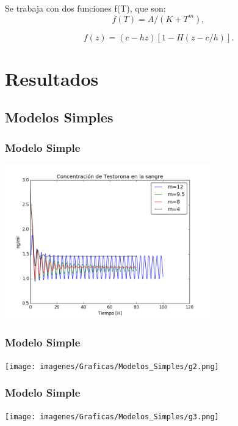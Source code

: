 \documentclass[10pt]{beamer}
\begin{document}
\begin{frame}
Se trabaja con dos funciones f(T), que son: \\

$$f(T) = A/(K+T^m) ,$$

$$ f(z) = (c-hz)[1-H(z-c/h)] .$$

\end{frame}

\section{Resultados}
\subsection{Modelos Simples}
\begin{frame}
\frametitle{Modelo Simple}
\begin{center}
 \includegraphics[width=3.5in]{imagenes/Graficas/Modelos_Simples/g1.png}
\end{center}
\end{frame}

\begin{frame}
\frametitle{Modelo Simple}
\begin{center}
 \texttt{[image: imagenes/Graficas/Modelos\_Simples/g2.png]}
\end{center}
\end{frame}

\begin{frame}
\frametitle{Modelo Simple}
\begin{center}
 \texttt{[image: imagenes/Graficas/Modelos\_Simples/g3.png]}
\end{center}
\end{frame}
\end{document}

